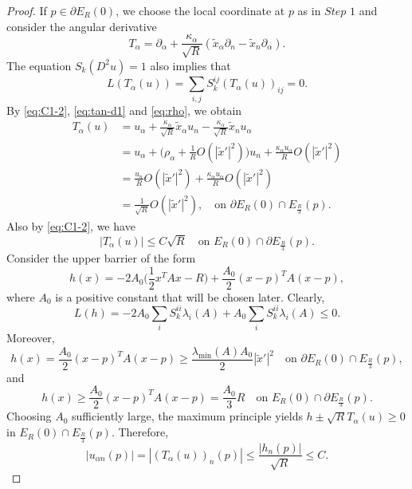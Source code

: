\documentclass[reqno]{amsart}
\theoremstyle{remark}
\theoremstyle{definition}
\numberwithin{equation}{section}
\begin{document}
\begin{proof}
	If $p\in\partial E_R(0)$, we choose the local coordinate at $p$ as in $\textit{Step 1}$ and consider the angular derivative
	\[T_\alpha=\partial_\alpha+\frac{\kappa_\alpha}{\sqrt R}(\tilde x_\alpha\partial_n-\tilde x_n\partial_\alpha). \]
	 The equation $S_k(D^2u)=1$ also implies that
	 \[
	L(T_\alpha(u))=\sum_{i,j} S_k^{ij}(T_{\alpha}(u))_{ij} = 0.
	\] 
	By \eqref{eq:C1-2}, \eqref{eq:tan-d1} and \eqref{eq:rho}, we obtain
	\begin{equation*}
		\begin{split}
			T_\alpha(u) & =u_\alpha+\frac{\kappa_\alpha}{\sqrt R}\tilde{x}_\alpha u_n-\frac{\kappa_\alpha}{\sqrt R}\tilde x_nu_\alpha \\
			& =u_\alpha+\bigg(\rho_\alpha+\frac{1}{R}O(|\tilde x'|^2)\bigg)u_n+\frac{\kappa_\alpha u_\alpha}{R}O(|\tilde x'|^2) \\
			& =\frac{u_n}{R}O(|\tilde x'|^2)+\frac{\kappa_\alpha u_\alpha}{R} O(|\tilde x'|^2) \\
			& =\frac{1}{\sqrt R}O(|\tilde x'|^2), \quad\text{on }\partial E_R(0)\cap E_{\frac{R}{3}}(p).
		\end{split}	
	\end{equation*}
	Also by \eqref{eq:C1-2}, we have
	\[|T_\alpha(u)|\leq C\sqrt{R}\quad\text{on }E_R(0)\cap\partial E_{\frac{R}{3}}(p).\]
	Consider the upper barrier of the form
	\[
	h(x) = -2A_0\bigg(\frac{1}{2}x^TAx-R\bigg)+\frac{A_0}{2}(x-p)^TA(x-p),
	\]
	where \(A_0\) is a positive constant that will be chosen later. Clearly, 
	\[L(h)=-2A_0\sum_{i}S_k^{ii}\lambda_i(A)+A_0\sum_{i}S_k^{ii}\lambda_i(A)\leq0.\]
	Moreover, 
	\[
	h(x) = \frac{A_0}{2}(x-p)^TA(x-p)\geq \frac{\lambda_{\text{min}}(A)A_0}{2}|\tilde x'|^2 \quad\text{on }\partial E_R(0)\cap E_{\frac{R}{3}}(p),
	\]
	and
	\[
	h(x) \geq \frac{A_0}{2}(x-p)^TA(x-p) =\frac{A_0}{3}R \quad\text{on }E_R(0)\cap\partial E_{\frac{R}{3}}(p).
	\] 
	Choosing \(A_0\) sufficiently large, the maximum principle yields \(h\pm \sqrt R T_\alpha(u)\geq 0\) in \(E_R(0)\cap E_{\frac{R}{3}}(p)\). Therefore, 
	\begin{equation}\label{eq:TN-2}
		|u_{\alpha n}(p)|=|(T_\alpha(u))_n(p)|\leq\frac{|h_n(p)|}{\sqrt R} \leq C.
	\end{equation}


\end{proof}
\end{document}
